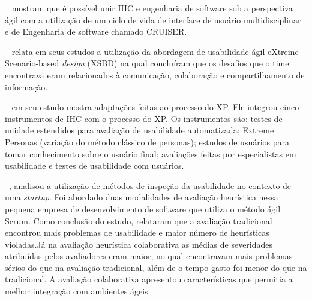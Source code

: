 ~ mostram que é possível unir IHC e engenharia de software sob a perspectiva ágil com a utilização de um ciclo de vida de interface de usuário multidisciplinar e de Engenharia de software chamado CRUISER.



~ relata em seus estudos a utilização da abordagem de usabilidade ágil eXtreme Scenario-based \emph{design} (XSBD) na qual concluíram que os desafios que o time encontrava eram relacionados à comunicação, colaboração e compartilhamento de informação.

~ em seu estudo mostra adaptações feitas ao processo do XP. Ele integrou cinco instrumentos de IHC com o processo do XP. Os instrumentos são: testes de unidade estendidos para avaliação de usabilidade automatizada; Extreme Personas (variação do método clássico de personas); estudos de usuários para tomar conhecimento sobre o usuário final; avaliações feitas por especialistas em usabilidade e testes de usabilidade com usuários.
 
~, analisou a utilização de métodos de inspeção da usabilidade no contexto de uma \textit{startup}. Foi abordado duas modalidades de avaliação heurística nessa pequena empresa de desenvolvimento de software que utiliza o método ágil Scrum. Como conclusão do estudo, relataram que a avaliação tradicional encontrou mais problemas de usabilidade e maior número de heurísticas violadas.Já na avaliação heurística colaborativa as médias de severidades atribuídas pelos avaliadores eram maior, no qual encontravam mais problemas sérios do que na avaliação tradicional, além de o tempo gasto foi menor do que na tradicional. A avaliação colaborativa apresentou características que permitia a melhor integração com ambientes ágeis.


